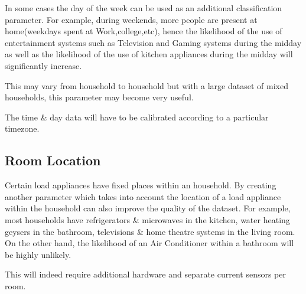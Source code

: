 In some cases the day of the week can be used as an additional classification parameter. For example, during weekends, more people are present at home(weekdays spent at Work,college,etc), hence the likelihood of the use of entertainment systems such as Television and Gaming systems during the midday as well as the likelihood of the use of kitchen appliances during the midday will significantly increase. 

This may vary from household to household but with a large dataset of mixed households, this parameter may become very useful.

The time & day data will have to be calibrated according to a particular timezone.

\subsection{Room Location}
{
Certain load appliances have fixed places within an household. By creating another parameter which takes into account the location of a load appliance within the household can also improve the quality of the dataset. 
For example, most households have refrigerators & microwaves in the kitchen, water heating geysers in the bathroom, televisions & home theatre systems in the living room. On the other hand, the likelihood of an Air Conditioner within a bathroom will be highly unlikely. 

This will indeed require additional hardware and separate current sensors per room.
}


